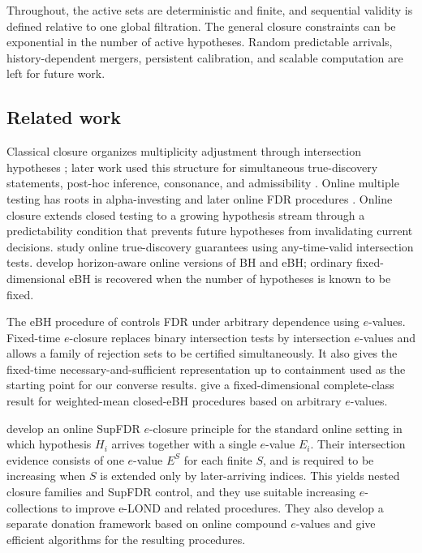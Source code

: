 \documentclass[11pt]{article}
\numberwithin{equation}{section}
\theoremstyle{plain}
\theoremstyle{definition}
\begin{document}
Throughout, the active sets are deterministic and finite, and sequential validity is defined relative to one global filtration. The general closure constraints can be exponential in the number of active hypotheses. Random predictable arrivals, history-dependent mergers, persistent calibration, and scalable computation are left for future work.

\subsection{Related work}\label{sec:related}

Classical closure organizes multiplicity adjustment through intersection hypotheses \citep{MarcusPeritzGabriel1976}; later work used this structure for simultaneous true-discovery statements, post-hoc inference, consonance, and admissibility \citep{GoemanSolari2011,GoemanHemerikSolari2021}. Online multiple testing has roots in alpha-investing \citep{FosterStine2008} and later online FDR procedures \citep{JavanmardMontanari2018}. Online closure \citep{FischerBofillBrannath2024} extends closed testing to a growing hypothesis stream through a predictability condition that prevents future hypotheses from invalidating current decisions. \citet{FischerRamdas2024} study online true-discovery guarantees using any-time-valid intersection tests. \citet{FischerXuRamdas2024OnlineBH} develop horizon-aware online versions of BH and eBH; ordinary fixed-dimensional eBH is recovered when the number of hypotheses is known to be fixed.

The eBH procedure of \citet{WangRamdas2022} controls FDR under arbitrary dependence using $e$-values. Fixed-time $e$-closure \citep{XuEtAl2026Closure} replaces binary intersection tests by intersection $e$-values and allows a family of rejection sets to be certified simultaneously. It also gives the fixed-time necessary-and-sufficient representation up to containment used as the starting point for our converse results. \citet{SunWang2026Admissibility} give a fixed-dimensional complete-class result for weighted-mean closed-eBH procedures based on arbitrary $e$-values. 

\citet{XuFischerRamdas2026Online} develop an online SupFDR $e$-closure
principle for the standard online setting in which hypothesis $H_i$
arrives together with a single $e$-value $E_i$. Their intersection
evidence consists of one $e$-value $E^S$ for each finite $S$, and is
required to be increasing when $S$ is extended only by later-arriving
indices. This yields nested closure families and SupFDR control, and
they use suitable increasing $e$-collections to improve e-LOND and
related procedures. They also develop a separate donation framework
based on online compound $e$-values and give efficient algorithms for
the resulting procedures.
\end{document}

